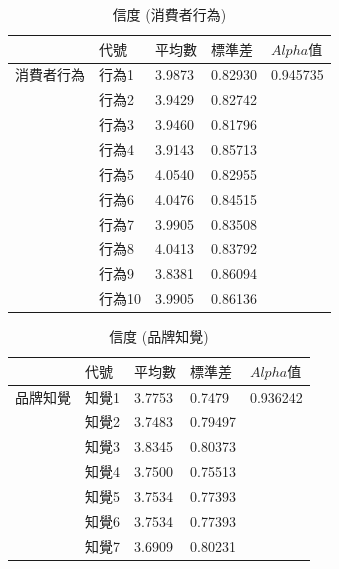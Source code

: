 \begin{table}[htb]
\caption{信度 (消費者行為)}
\label{tab:e1}
\renewcommand{\arraystretch}{1.2} %
\arrayrulewidth=1pt               %
\tabcolsep=6pt                   %
\begin{tabular}[t]{lllll}  %
\hline
 & $代號$& $平均數$ & $標準差$& $ Alpha 值 $ \\
\hline
消費者行為&行為1&3.9873&0.82930&0.945735\\
               &行為2&3.9429	&0.82742&\\	
               &行為3&3.9460&0.81796&\\
               &行為4&3.9143&0.85713&\\
               &行為5&4.0540&0.82955&\\
               &行為6&4.0476&0.84515&\\
               &行為7&3.9905&0.83508&\\
               &行為8&4.0413&0.83792&\\
               &行為9&3.8381&0.86094&\\
               &行為10&3.9905&0.86136&\\
\hline
\end{tabular}
\end{table}

\begin{table}[htb]
\caption{信度 (品牌知覺)}
\label{tab:e1}
\renewcommand{\arraystretch}{1.2} %
\arrayrulewidth=1pt               %
\tabcolsep=6pt                   %
\begin{tabular}[t]{lllll}  %
\hline
 & $代號$& $平均數$ & $標準差$& $ Alpha 值 $ \\
\hline
品牌知覺 & 知覺1  & 3.7753   & 0.7479  &0.936242 \\
              & 知覺2  & 3.7483  &0.79497  &  \\
             & 知覺3  & 3.8345    & 0.80373  &  \\
             & 知覺4 & 3.7500   &0.75513  &\\
             & 知覺5   & 3.7534  & 0.77393 &  \\
             & 知覺6  & 3.7534    &  0.77393 & \\
             & 知覺7  & 3.6909     & 0.80231  &  \\
\hline
\end{tabular}
\end{table}

